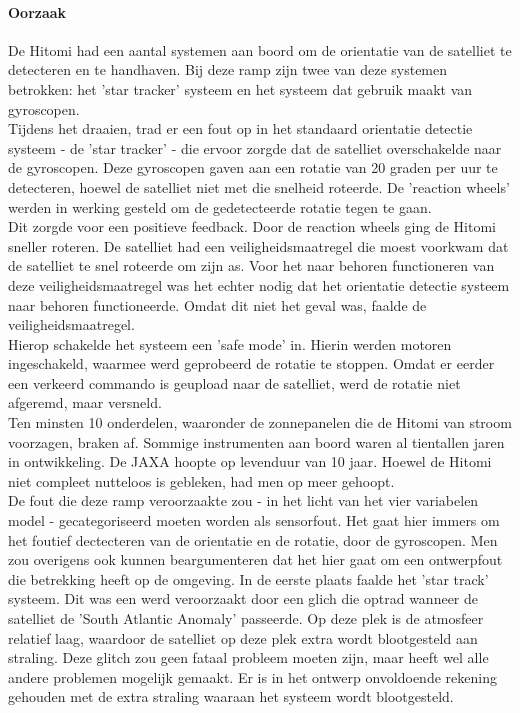 \documentclass{article}
\begin{document}
				\paragraph{Oorzaak}

					De Hitomi had een aantal systemen aan boord om de orientatie van de satelliet te detecteren en te handhaven. Bij deze ramp zijn twee van deze systemen betrokken: het 'star tracker' systeem en het systeem dat gebruik maakt van gyroscopen. \\
					 Tijdens het draaien, trad er een fout op in het standaard orientatie detectie systeem - de 'star tracker' - die ervoor zorgde dat de satelliet overschakelde naar de gyroscopen. Deze gyroscopen gaven aan een rotatie van 20 graden per uur te detecteren, hoewel de satelliet niet met die snelheid roteerde. De 'reaction wheels' werden in werking gesteld om de gedetecteerde rotatie tegen te gaan. \\
					Dit zorgde voor een positieve feedback. Door de reaction wheels ging de Hitomi sneller roteren. De satelliet had een veiligheidsmaatregel die moest voorkwam dat de satelliet te snel roteerde om zijn as. Voor het naar behoren functioneren van deze veiligheidsmaatregel was het echter nodig dat het orientatie detectie systeem naar behoren functioneerde. Omdat dit niet het geval was, faalde de veiligheidsmaatregel. \\
					Hierop schakelde het systeem een 'safe mode' in. Hierin werden motoren ingeschakeld, waarmee werd geprobeerd de rotatie te stoppen. Omdat er eerder een verkeerd commando is geupload naar de satelliet, werd de rotatie niet afgeremd, maar versneld. \\
					Ten minsten 10 onderdelen, waaronder de zonnepanelen die de Hitomi van stroom voorzagen, braken af. Sommige instrumenten aan boord waren al tientallen jaren in ontwikkeling. De JAXA hoopte op levenduur van 10 jaar. Hoewel de Hitomi niet compleet nutteloos is gebleken, had men op meer gehoopt. \cite{witze2016software} \\
					De fout die deze ramp veroorzaakte zou - in het licht van het vier variabelen model - gecategoriseerd moeten worden als sensorfout. Het gaat hier immers om het foutief dectecteren van de orientatie en de rotatie, door de gyroscopen. Men zou overigens ook kunnen beargumenteren dat het hier gaat om een ontwerpfout die betrekking heeft op de omgeving. In de eerste plaats faalde het 'star track' systeem. Dit was een werd veroorzaakt door een glich die optrad wanneer de satelliet de 'South Atlantic Anomaly' passeerde. Op deze plek is de atmosfeer relatief laag, waardoor de satelliet op deze plek extra wordt blootgesteld aan straling. Deze glitch zou geen fataal probleem moeten zijn, maar heeft wel alle andere problemen mogelijk gemaakt. Er is in het ontwerp onvoldoende rekening gehouden met de extra straling waaraan het systeem wordt blootgesteld. \par
				
\end{document}
